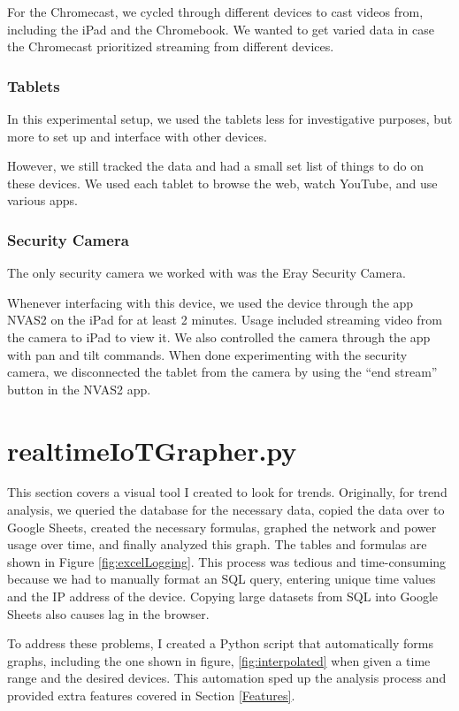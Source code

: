 For the Chromecast, we cycled through different devices to cast videos from, including the iPad and the Chromebook. We wanted to get varied data in case the Chromecast prioritized streaming from different devices.

\subsubsection{Tablets}
In this experimental setup, we used the tablets less for investigative purposes, but more to set up and interface with other devices.

However, we still tracked the data and had a small set list of things to do on these devices. We used each tablet to browse the web, watch YouTube, and use various apps.

\subsubsection{Security Camera}

The only security camera we worked with was the Eray Security Camera.

Whenever interfacing with this device, we used the device through the app NVAS2 \cite{nvas2} on the iPad for at least 2 minutes. Usage included streaming video from the camera to iPad to view it. We also controlled the camera through the app with pan and tilt commands. When done experimenting with the security camera, we disconnected the tablet from the camera by using the ``end stream'' button in the NVAS2 app.

\section{realtimeIoTGrapher.py}
\label{realtimeIoTGrapher.py}

This section covers a visual tool I created to look for trends. Originally, for trend analysis, we queried the database for the necessary data, copied the data over to Google Sheets, created the necessary formulas, graphed the network and power usage over time, and finally analyzed this graph. The tables and formulas are shown in Figure \ref{fig:excelLogging}. This process was tedious and time-consuming because we had to manually format an SQL query, entering unique time values and the IP address of the device. Copying large datasets from SQL into Google Sheets also causes lag in the browser.

To address these problems, I created a Python script that automatically forms graphs, including the one shown in figure, \ref{fig:interpolated} when given a time range and the desired devices. This automation sped up the analysis process and provided extra features covered in Section \ref{Features}.

